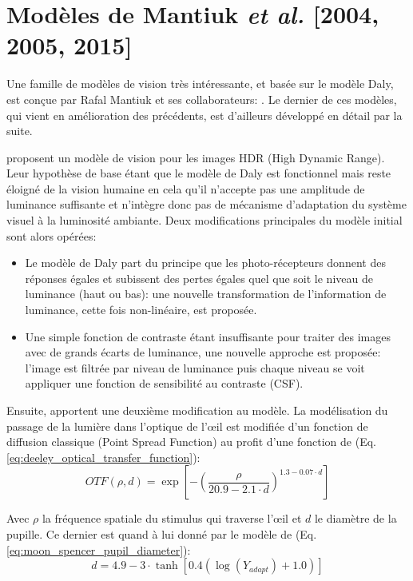	\section{Modèles de Mantiuk \textit{et al.} [2004, 2005, 2015]}
	\par Une famille de modèles de vision très intéressante, et basée sur le modèle Daly, est conçue par Rafal Mantiuk et ses collaborateurs: \citep{mantiuk_visible_2004,mantiuk_predicting_2005,mantiuk_human_2015}. Le dernier de ces modèles, qui vient en amélioration des précédents, est d'ailleurs développé en détail par la suite.
	
	\par \citep{mantiuk_visible_2004} proposent un modèle de vision pour les images HDR (High Dynamic Range). Leur hypothèse de base étant que le modèle de Daly est fonctionnel mais reste éloigné de la vision humaine en cela qu'il n'accepte pas une amplitude de luminance suffisante et n'intègre donc pas de mécanisme d'adaptation du système visuel à la luminosité ambiante. Deux modifications principales du modèle initial sont alors opérées:
	\begin{itemize}
	\item Le modèle de Daly part du principe que les photo-récepteurs donnent des réponses égales et subissent des pertes égales quel que soit le niveau de luminance (haut ou bas): une nouvelle transformation de l'information de luminance, cette fois non-linéaire, est proposée.
	\item Une simple fonction de contraste étant insuffisante pour traiter des images avec de grands écarts de luminance, une nouvelle approche est proposée: l'image est filtrée par niveau de luminance puis chaque niveau se voit appliquer une fonction de sensibilité au contraste (CSF).
	\end{itemize}
	
	\par Ensuite, \citep{mantiuk_predicting_2005} apportent une deuxième modification au modèle. La modélisation du passage de la lumière dans l'optique de l'œil est modifiée d'un fonction de diffusion classique (Point Spread Function) au profit d'une fonction de \citep{deeley_simple_1991} (Eq. \ref{eq:deeley_optical_transfer_function}):
	\begin{equation}
	OTF(\rho,d) = \exp \left[ - \left( \frac{\rho}{20.9 - 2.1 \cdot d} \right)^{1.3 - 0.07 \cdot d} \right]
	\label{eq:deeley_optical_transfer_function}
	\end{equation}
	
	\par Avec $\rho$ la fréquence spatiale du stimulus qui traverse l'œil et $d$ le diamètre de la pupille. Ce dernier est quand à lui donné par le modèle de \citep{moon_visual_1944} (Eq. \ref{eq:moon_spencer_pupil_diameter}):
	\begin{equation}
	d = 4.9 - 3 \cdot \tanh \left[ 0.4 \left( \log(Y_{adapt}) + 1.0 \right) \right]
	\label{eq:moon_spencer_pupil_diameter}
	\end{equation}
	
